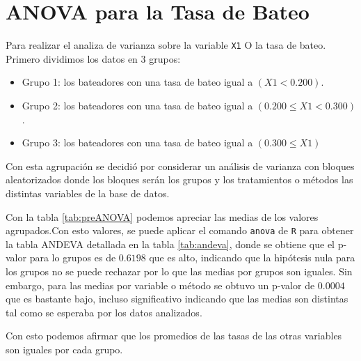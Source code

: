\documentclass{staprojteamusb}
\providecommand{\tightlist}{%
	\setlength{\itemsep}{0pt}\setlength{\parskip}{0pt}}
\begin{document}
	
	
	\maketitle
	
	
	
	\hypertarget{anova-para-la-tasa-de-bateo}{%
 \section{ANOVA para la Tasa de Bateo}\label{anova-para-la-tasa-de-bateo}}

 Para realizar el analiza de varianza sobre la variable \texttt{X1} O la tasa de bateo. Primero dividimos los datos en 3 grupos:

 \begin{itemize}
 \tightlist
 \item
   Grupo 1: los bateadores con una tasa de bateo igual a \((X1<0.200)\).
 \item
   Grupo 2: los bateadores con una tasa de bateo igual a \((0.200\leq X1 < 0.300)\).
 \item
   Grupo 3: los bateadores con una tasa de bateo igual a \((0.300\leq X1)\)
 \end{itemize}

 Con esta agrupación se decidió por considerar un análisis de varianza con bloques aleatorizados donde los bloques serán los grupos y los tratamientos o métodos las distintas variables de la base de datos.

 Con la tabla \ref{tab:preANOVA} podemos apreciar las medias de los valores agrupados.Con esto valores, se puede aplicar el comando \texttt{anova} de \texttt{R} para obtener la tabla ANDEVA detallada en la tabla \ref{tab:andeva}, donde se obtiene que el p-valor para lo grupos es de \(0.6198\) que es alto, indicando que la hipótesis nula para los grupos no se puede rechazar por lo que las medias por grupos son iguales. Sin embargo, para las medias por variable o método se obtuvo un p-valor de \(0.0004\) que es bastante bajo, incluso significativo indicando que las medias son distintas tal como se esperaba por los datos analizados.

 Con esto podemos afirmar que los promedios de las tasas de las otras variables son iguales por cada grupo.
\end{document}

